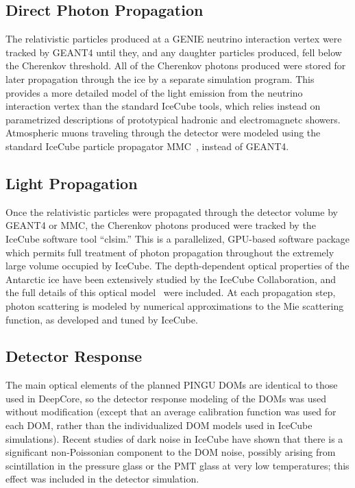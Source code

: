 \documentclass[../Main.tex]{subfiles}
\begin{document}
\subsection{Direct Photon Propagation}\label{sec:photonPropagation}

The relativistic particles produced at a GENIE neutrino interaction
vertex were tracked by GEANT4 until they, and any daughter particles
produced, fell below the Cherenkov threshold.  All of the Cherenkov
photons produced were stored for later propagation through the ice by
a separate simulation program.  This provides a more detailed model of
the light emission from the neutrino interaction vertex than the
standard IceCube tools, which relies instead on parametrized
descriptions of prototypical hadronic and electromagnetc showers.
Atmospheric muons traveling through the detector were modeled using
the standard IceCube particle propagator MMC~\cite{Chirkin:2004hz},
instead of GEANT4.

\subsection{Light Propagation}
\label{sec:}

Once the relativistic particles were propagated through the detector
volume by GEANT4 or MMC, the Cherenkov photons produced were tracked
by the IceCube software tool ``clsim.''  This is a parallelized,
GPU-based software package which permits full treatment of photon
propagation throughout the extremely large volume occupied by IceCube.
The depth-dependent optical properties of the Antarctic ice have been
extensively studied by the IceCube Collaboration, and the full details
of this optical model~\cite{Aartsen:2013rt} were included.  At each
propagation step, photon scattering is modeled by numerical
approximations to the Mie scattering function, as developed and tuned
by IceCube.

\subsection{Detector Response}\label{sec:detResponse}

The main optical elements of the planned PINGU DOMs are identical to
those used in DeepCore, so the detector response modeling of the DOMs
was used without modification (except that an average calibration
function was used for each DOM, rather than the individualized DOM
models used in IceCube simulations).   Recent studies of dark noise in
IceCube have shown that there is a significant non-Poissonian
component to the DOM noise, possibly arising from scintillation in the
pressure glass or the PMT glass at very low temperatures; this effect
was included in the detector simulation.
\end{document}
